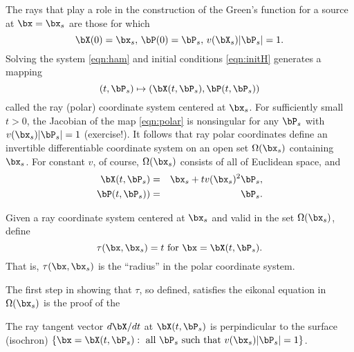 The rays that play a role in the construction of the Green's function
for a source at $\bx=\bx_s$ are those for which 
\begin{equation}
\label{eqn:initH}
\bX(0)=\bx_s, \, \bP(0) = \bP_s, \, v(\bX_s)|\bP_s|=1.
\end{equation}
Solving the system \ref{eqn:ham} and initial conditions
\ref{eqn:initH} generates a mapping
\begin{equation}
\label{eqn:polar}
(t,\bP_s) \mapsto (\bX(t,\bP_s), \bP(t,\bP_s)) 
\end{equation}
called the ray (polar) coordinate system centered at $\bx_s$. For
sufficiently small $t>0$, the Jacobian of the map \ref{eqn:polar} is
nonsingular for any $\bP_s$ with $v(\bx_s)|\bP_s|=1$ (exercise!). It
follows that ray polar coordinates define an invertible differentiable
coordinate system on an open set $\Omega(\bx_s)$ containing
$\bx_s$. For constant $v$, of course, $\Omega(\bx_s)$ consists of all
of Euclidean space, and
\begin{eqnarray}
\label{eqn:polar0}
\bX(t,\bP_s) &=& \bx_s + t v(\bx_s)^2\bP_s,\\
\bP(t,\bP_s)) &=& \bP_s. 
\end{eqnarray}

Given a ray coordinate system centered at $\bx_s$ and valid in the set
$\Omega(\bx_s)$, define
\begin{equation}
\label{eqn:taudef}
\tau(\bx, \bx_s) = t \mbox{ for } \bx=\bX(t,\bP_s).
\end{equation}
That is, $\tau(\bx,\bx_s)$ is the ``radius'' in the polar coordinate
system.

The first step in showing that $\tau$, so defined, satisfies the eikonal equation in
$\Omega(\bx_s)$ is the proof of the

 The ray tangent vector $d\bX/dt$ at
$\bX(t,\bP_s)$ is perpindicular to the surface (isochron) $\{\bx=\bX(t,\bP_s):\mbox{ all } \bP_s \mbox{ such that } v(\bx_s)|\bP_s|=1\}$. 

